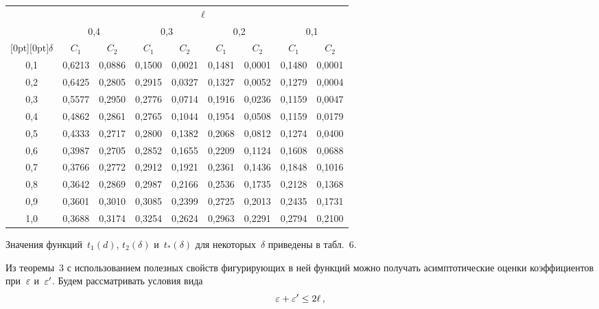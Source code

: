\begin{multicols}{2}
\begin{table*}[b]
\begin{center}
\tabcolsep=14.4pt
\begin{tabular}{|c|c|c|c|c|c|c|c|c|}
\hline
 & \multicolumn {8}{c|}{$\ell$}\\
 \cline{2-9}
&\multicolumn{2}{c|}{0,4}& \multicolumn{2}{c|}{0,3}& \multicolumn{2}{c|}{0,2}& \multicolumn{2}{c|}{0,1}\\
\cline{2-9}
\multicolumn{1}{|c|}{\raisebox{10pt}[0pt][0pt]{$\delta$}}& $C_1$&$C_2$&$ C_1$&$C_2$&$ C_1$&$C_2$&$ C_1$&$C_2$\\
\hline
0,1 &   0,6213  &   0,0886  &   0,1500  &   0,0021  &   0,1481  &    0,0001 &   0,1480  &   0,0001  \\
0,2 &   0,6425  &   0,2805  &   0,2915  &   0,0327  &   0,1327  &    0,0052 &   0,1279  &   0,0004  \\
0,3 &   0,5577  &   0,2950  &   0,2776  &   0,0714  &   0,1916  &    0,0236 &   0,1159  &   0,0047  \\
0,4 &   0,4862  &   0,2861  &   0,2765  &   0,1044  &   0,1954  &    0,0508 &   0,1159  &   0,0179  \\
0,5 &   0,4333  &   0,2717  &   0,2800  &   0,1382  &   0,2068  &    0,0812 &   0,1274  &   0,0400  \\
0,6 &   0,3987  &   0,2705  &   0,2852  &   0,1655  &   0,2209  &    0,1124 &   0,1608  &   0,0688  \\
0,7 &   0,3766  &   0,2772  &   0,2912  &   0,1921  &   0,2361  &    0,1436 &   0,1848  &   0,1016  \\
0,8 &   0,3642  &   0,2869  &   0,2987  &   0,2166  &   0,2536  &    0,1735 &   0,2128  &   0,1368  \\
0,9 &   0,3601  &   0,3010  &   0,3085  &   0,2399  &   0,2725  &    0,2013 &   0,2435  &   0,1731  \\
1,0 &   0,3688  &   0,3174  &   0,3254  &   0,2624  &   0,2963  &    0,2291 &   0,2794  &   0,2100  \\
 \hline
\end{tabular}
\end{center}
\end{table*}


\smallskip

Значения функций~$t_1(d)$, $t_2(\delta)$ и~$t_*(\delta)$ для некоторых~$\delta$ приведены в табл.~6.


Из теоремы~3 с использованием полезных свойств
фигурирующих в ней функций можно получать асимптотические оценки
коэффициентов при~$\varepsilon$ и~$\varepsilon'$. Будем рассматривать условия вида 
\begin{equation}
\varepsilon+\varepsilon'\le2\ell\,,
\label{eps+eps'<=2ell}
\end{equation}


\end{multicols}
